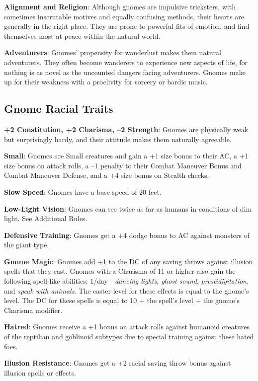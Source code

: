 \textbf{Alignment and Religion}: Although gnomes are impulsive tricksters, with sometimes inscrutable motives and equally confusing methods, their hearts are generally in the right place. They are prone to powerful fits of emotion, and find themselves most at peace within the natural world.
				
\textbf{Adventurers}: Gnomes' propensity for wanderlust makes them natural adventurers. They often become wanderers to experience new aspects of life, for nothing is as novel as the uncounted dangers facing adventurers. Gnomes make up for their weakness with a proclivity for sorcery or bardic music.
							
\subsection{Gnome Racial Traits}

				
\textbf{+2 Constitution, +2 Charisma, --2 Strength}: Gnomes are physically weak but surprisingly hardy, and their attitude makes them naturally agreeable.
				
\textbf{Small}: Gnomes are Small creatures and gain a +1 size bonus to their AC, a +1 size bonus on attack rolls, a --1 penalty to their Combat Maneuver Bonus and Combat Maneuver Defense, and a +4 size bonus on Stealth checks.
				
\textbf{Slow Speed}: Gnomes have a base speed of 20 feet.
				
\textbf{Low-Light Vision}: Gnomes can see twice as far as humans in conditions of dim light. See Additional Rules.
				
\textbf{Defensive Training}: Gnomes get a +4 dodge bonus to AC against monsters of the giant type.
				
\textbf{Gnome Magic}: Gnomes add +1 to the DC of any saving throws against illusion spells that they cast. Gnomes with a Charisma of 11 or higher also gain the following spell-like abilities: 1/day---\textit{dancing lights, ghost sound},\textit{ prestidigitation,} and \textit{speak with animals. }The caster level for these effects is equal to the gnome's level. The DC for these spells is equal to 10 + the spell's level + the gnome's Charisma modifier.
				
\textbf{Hatred}: Gnomes receive a +1 bonus on attack rolls against humanoid creatures of the reptilian and goblinoid subtypes due to special training against these hated foes.
				
\textbf{Illusion Resistance}: Gnomes get a +2 racial saving throw bonus against illusion spells or effects.
				
